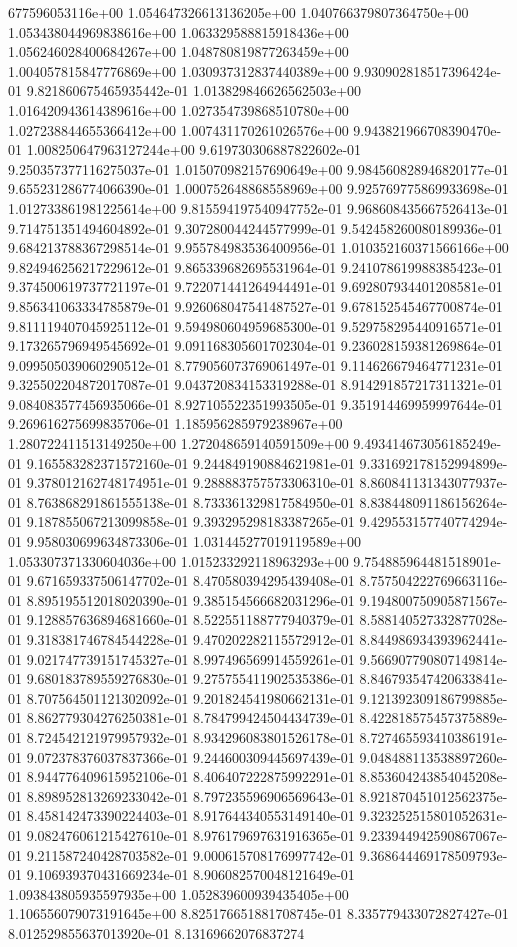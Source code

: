 677596053116e+00	1.054647326613136205e+00	1.040766379807364750e+00	1.053438044969838616e+00	1.063329588815918436e+00	1.056246028400684267e+00	1.048780819877263459e+00	1.004057815847776869e+00	1.030937312837440389e+00	9.930902818517396424e-01	9.821860675465935442e-01	1.013829846626562503e+00	1.016420943614389616e+00	1.027354739868510780e+00	1.027238844655366412e+00	1.007431170261026576e+00	9.943821966708390470e-01	1.008250647963127244e+00	9.619730306887822602e-01	9.250357377116275037e-01	1.015070982157690649e+00	9.984560828946820177e-01	9.655231286774066390e-01	1.000752648868558969e+00	9.925769775869933698e-01	1.012733861981225614e+00	9.815594197540947752e-01	9.968608435667526413e-01	9.714751351494604892e-01	9.307280044244577999e-01	9.542458260080189936e-01	9.684213788367298514e-01	9.955784983536400956e-01	1.010352160371566166e+00	9.824946256217229612e-01	9.865339682695531964e-01	9.241078619988385423e-01	9.374500619737721197e-01	9.722071441264944491e-01	9.692807934401208581e-01	9.856341063334785879e-01	9.926068047541487527e-01	9.678152545467700874e-01	9.811119407045925112e-01	9.594980604959685300e-01	9.529758295440916571e-01	9.173265796949545692e-01	9.091168305601702304e-01	9.236028159381269864e-01	9.099505039060290512e-01	8.779056073769061497e-01	9.114626679464771231e-01	9.325502204872017087e-01	9.043720834153319288e-01	8.914291857217311321e-01	9.084083577456935066e-01	8.927105522351993505e-01	9.351914469959997644e-01	9.269616275699835706e-01	1.185956285979238967e+00	1.280722411513149250e+00	1.272048659140591509e+00	9.493414673056185249e-01	9.165583282371572160e-01	9.244849190884621981e-01	9.331692178152994899e-01	9.378012162748174951e-01	9.288883757573306310e-01	8.860841131343077937e-01	8.763868291861555138e-01	8.733361329817584950e-01	8.838448091186156264e-01	9.187855067213099858e-01	9.393295298183387265e-01	9.429553157740774294e-01	9.958030699634873306e-01	1.031445277019119589e+00	1.053307371330604036e+00	1.015233292118963293e+00	9.754885964481518901e-01	9.671659337506147702e-01	8.470580394295439408e-01	8.757504222769663116e-01	8.895195512018020390e-01	9.385154566682031296e-01	9.194800750905871567e-01	9.128857636894681660e-01	8.522551188777940379e-01	8.588140527332877028e-01	9.318381746784544228e-01	9.470202282115572912e-01	8.844986934393962441e-01	9.021747739151745327e-01	8.997496569914559261e-01	9.566907790807149814e-01	9.680183789559276830e-01	9.275755411902535386e-01	8.846793547420633841e-01	8.707564501121302092e-01	9.201824541980662131e-01	9.121392309186799885e-01	8.862779304276250381e-01	8.784799424504434739e-01	8.422818575457375889e-01	8.724542121979957932e-01	8.934296083801526178e-01	8.727465593410386191e-01	9.072378376037837366e-01	9.244600309445697439e-01	9.048488113538897260e-01	8.944776409615952106e-01	8.406407222875992291e-01	8.853604243854045208e-01	8.898952813269233042e-01	8.797235596906569643e-01	8.921870451012562375e-01	8.458142473390224403e-01	8.917644340553149140e-01	9.323252515801052631e-01	9.082476061215427610e-01	8.976179697631916365e-01	9.233944942590867067e-01	9.211587240428703582e-01	9.000615708176997742e-01	9.368644469178509793e-01	9.106939370431669234e-01	8.906082570048121649e-01	1.093843805935597935e+00	1.052839600939435405e+00	1.106556079073191645e+00	8.825176651881708745e-01	8.335779433072827427e-01	8.012529855637013920e-01	8.13169662076837274